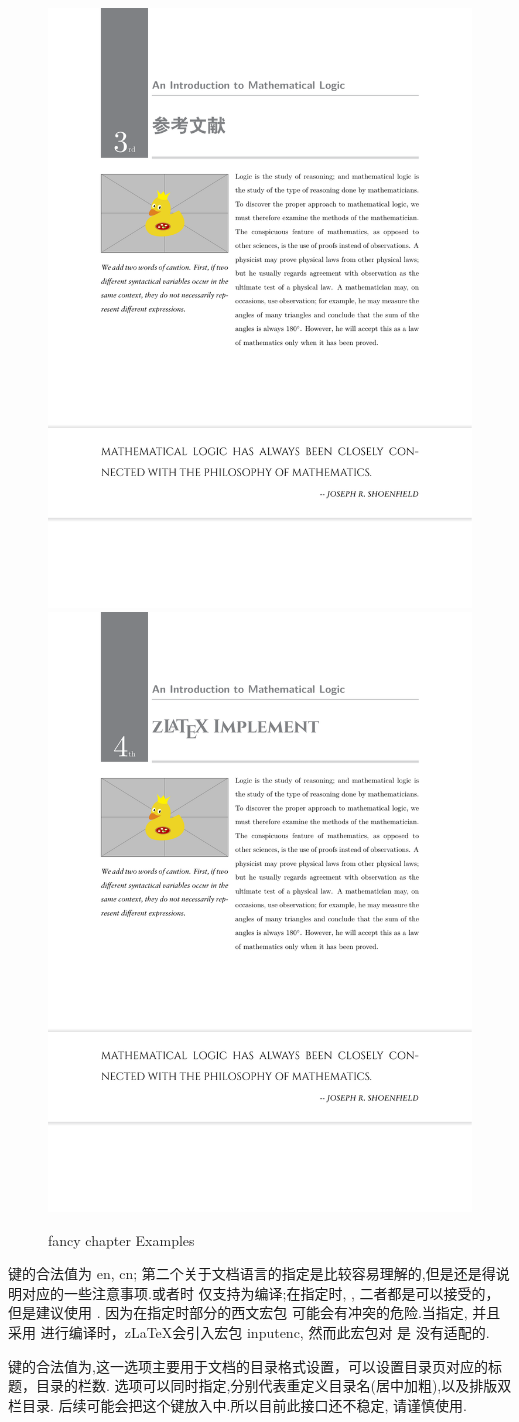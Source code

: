 \begin{figure}[!htb]
  \includegraphics[width=.45\linewidth]{./pics/fancy_chapter_3.pdf}
  \includegraphics[width=.45\linewidth]{./pics/fancy_chapter_4.pdf}
  \caption{fancy chapter Examples}
  \label{fig:fancy-chapter-examples}
\end{figure}

键的合法值为 {en, cn}; 第二个关于文档语言的指定是比较容易理解的,但是还是得说明对应的一些注意事项.或者时
仅支持为编译;在指定时, ,  二者都是可以接受的，但是建议使用 . 因为在指定时部分的西文宏包
可能会有冲突的危险.当指定, 并且采用  进行编译时，z\LaTeX{}会引入宏包 {inputenc}, 然而此宏包对  是
没有适配的.

键的合法值为,这一选项主要用于文档的目录格式设置，可以设置目录页对应的标题，目录的栏数.
选项可以同时指定,分别代表重定义目录名(居中加粗),以及排版双栏目录.
后续可能会把这个键放入中.所以目前此接口还不稳定, 请谨慎使用.

